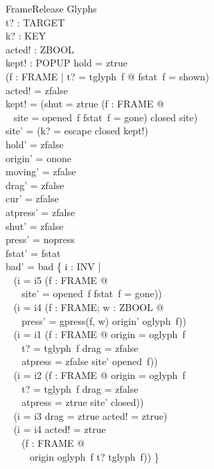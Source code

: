 \documentclass[a4paper,10pt,fleqn]{article}
\begin{document}
\begin{schema}{FrameRelease}
  \Delta Glyphs \\
  t? : TARGET \\
  k? : KEY \\
  acted! : ZBOOL \\
  kept! : POPUP
\where
  hold = ztrue \\
  (\forall f : FRAME | t? = tglyph~f @ fstat~f = shown) \\
  acted! = zfalse \\
  kept! = (\IF shut = ztrue \lor (\exists f : FRAME @ \\
  \quad~ site = opened~f \land fstat~f = gone) \THEN closed \ELSE site) \\
  site' = (\IF k? = escape \THEN closed \ELSE kept!) \\
  hold' = zfalse \\
  origin' = onone \\
  moving' = zfalse \\
  drag' = zfalse \\
  cur' = zfalse \\
  atpress' = zfalse \\
  shut' = zfalse \\
  press' = nopress \\
  fstat' = fstat \\
  bad' = bad \cup \{ i : INV | \\
  \quad~ (i = i5 \land (\exists f : FRAME @ \\
  \quad~ \quad~ site' = opened~f \land fstat~f = gone)) \\
  \quad~ \lor (i = i4 \land (\exists f : FRAME; w : ZBOOL @ \\
  \quad~ \quad~ press' = gpress(f, w) \land origin' \neq oglyph~f)) \\
  \quad~ \lor (i = i1 \land (\exists f : FRAME @ origin = oglyph~f \\
  \quad~ \quad~ \land t? = tglyph~f \land drag = zfalse \\
  \quad~ \quad~ \land atpress = zfalse \land site' \neq opened~f)) \\
  \quad~ \lor (i = i2 \land (\exists f : FRAME @ origin = oglyph~f \\
  \quad~ \quad~ \land t? = tglyph~f \land drag = zfalse \\
  \quad~ \quad~ \land atpress = ztrue \land site' \neq closed)) \\
  \quad~ \lor (i = i3 \land drag = ztrue \land acted! = ztrue) \\
  \quad~ \lor (i = i4 \land acted! = ztrue \\
  \quad~ \quad~ \land (\forall f : FRAME @ \\
  \quad~ \quad~ \quad~ origin \neq oglyph~f \lor t? \neq tglyph~f)) \}
\end{schema}
\end{document}
